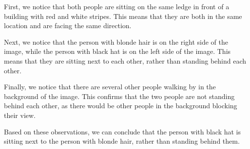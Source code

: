 \begin{enumerate}
    First, we notice that both people are sitting on the same ledge in front of a building with red and white stripes. This means that they are both in the same location and are facing the same direction.
    
    Next, we notice that the person with blonde hair is on the right side of the image, while the person with black hat is on the left side of the image. This means that they are sitting next to each other, rather than standing behind each other.
    
    Finally, we notice that there are several other people walking by in the background of the image. This confirms that the two people are not standing behind each other, as there would be other people in the background blocking their view.
    
    Based on these observations, we can conclude that the person with black hat is sitting next to the person with blonde hair, rather than standing behind them.
\end{enumerate}

